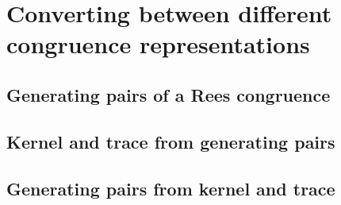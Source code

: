 \chapter{Converting between different congruence representations}
\label{chap:converting}

\lipsum[7]

\section{Generating pairs of a Rees congruence}
\label{sec:rees-to-pairs}

\section{Kernel and trace from generating pairs}
\label{sec:pairs-to-kertr}

\section{Generating pairs from kernel and trace}
\label{sec:kertr-to-pairs}
